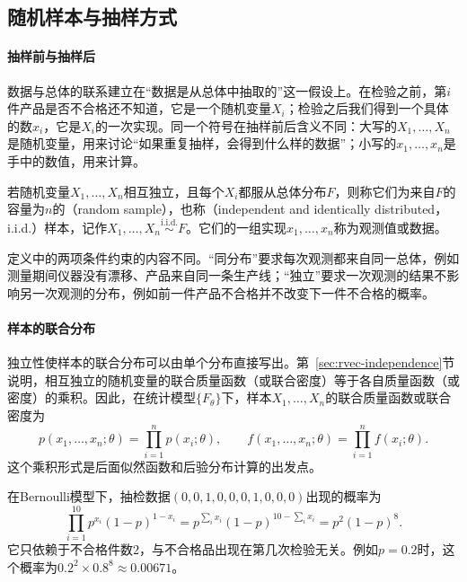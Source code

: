 \subsection{随机样本与抽样方式}

\paragraph{抽样前与抽样后}
数据与总体的联系建立在“数据是从总体中抽取的”这一假设上。在检验之前，第$i$件产品是否不合格还不知道，它是一个随机变量$X_i$；检验之后我们得到一个具体的数$x_i$，它是$X_i$的一次实现。同一个符号在抽样前后含义不同：大写的$X_1,\dots,X_n$是随机变量，用来讨论“如果重复抽样，会得到什么样的数据”；小写的$x_1,\dots,x_n$是手中的数值，用来计算。

\begin{definition}[随机样本]
\label{def:est-random-sample}
若随机变量$X_1,\dots,X_n$相互独立，且每个$X_i$都服从总体分布$F$，则称它们为来自$F$的容量为$n$的（random sample），也称（independent and identically distributed，i.i.d.）样本，记作$X_1,\dots,X_n\overset{\text{i.i.d.}}{\sim}F$。它们的一组实现$x_1,\dots,x_n$称为观测值或数据。
\end{definition}

定义中的两项条件约束的内容不同。“同分布”要求每次观测都来自同一总体，例如测量期间仪器没有漂移、产品来自同一条生产线；“独立”要求一次观测的结果不影响另一次观测的分布，例如前一件产品不合格并不改变下一件不合格的概率。

\paragraph{样本的联合分布}
独立性使样本的联合分布可以由单个分布直接写出。第~\ref{sec:rvec-independence}节说明，相互独立的随机变量的联合质量函数（或联合密度）等于各自质量函数（或密度）的乘积。因此，在统计模型$\{F_\theta\}$下，样本$X_1,\dots,X_n$的联合质量函数或联合密度为
\begin{equation}
\label{eq:est-sample-joint}
p(x_1,\dots,x_n;\theta)=\prod_{i=1}^n p(x_i;\theta),
\qquad
f(x_1,\dots,x_n;\theta)=\prod_{i=1}^n f(x_i;\theta).
\end{equation}
这个乘积形式是后面似然函数和后验分布计算的出发点。

\begin{example}[抽检数据的联合概率]
\label{ex:est-joint-bernoulli}
在Bernoulli模型下，抽检数据$(0,0,1,0,0,0,1,0,0,0)$出现的概率为
\[
\prod_{i=1}^{10}p^{x_i}(1-p)^{1-x_i}=p^{\sum_i x_i}(1-p)^{10-\sum_i x_i}=p^2(1-p)^8 .
\]
它只依赖于不合格件数$2$，与不合格品出现在第几次检验无关。例如$p=0.2$时，这个概率为$0.2^2\times0.8^8\approx0.00671$。
\end{example}

